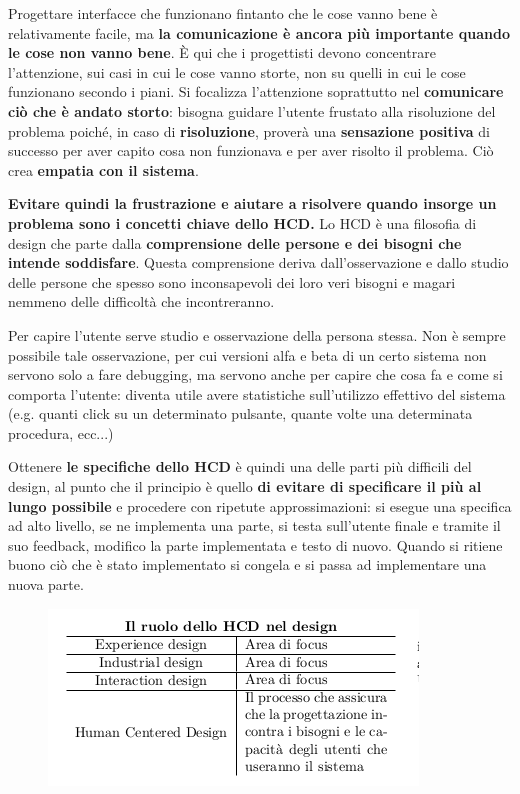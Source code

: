 \documentclass[a4paper,11pt,oneside]{book}
\begin{document}
Progettare interfacce che funzionano fintanto che le cose vanno bene è relativamente facile, ma \textbf{la comunicazione è ancora più importante quando le cose non vanno bene}. È qui che i progettisti devono concentrare l'attenzione, sui casi in cui le cose vanno storte, non su quelli in cui le cose funzionano secondo i piani. Si focalizza l'attenzione soprattutto nel \textbf{comunicare ciò che è andato storto}: bisogna guidare l'utente frustato alla risoluzione del problema poiché, in caso di \textbf{risoluzione}, proverà una \textbf{sensazione positiva} di successo per aver capito cosa non funzionava e per aver risolto il problema. Ciò crea \textbf{empatia con il sistema}.

\textbf{Evitare quindi la frustrazione e aiutare a risolvere quando insorge un problema sono i concetti chiave dello HCD.}
Lo HCD è una filosofia di design che parte dalla \textbf{comprensione delle persone e dei bisogni che intende soddisfare}. Questa comprensione deriva dall'osservazione e dallo studio delle persone che spesso sono inconsapevoli dei loro veri bisogni e magari nemmeno delle difficoltà che incontreranno.

Per capire l'utente serve studio e osservazione della persona stessa. Non è sempre possibile tale osservazione, per cui versioni alfa e beta di un certo sistema non servono solo a fare debugging, ma servono anche per capire che cosa fa e come si comporta l'utente: diventa utile avere statistiche sull'utilizzo effettivo del sistema (e.g. quanti click su un determinato pulsante, quante volte una determinata procedura, ecc...)

\pagebreak

Ottenere \textbf{le specifiche dello HCD} è quindi una delle parti più difficili del design, al punto che il principio è quello \textbf{di evitare di specificare il più al lungo possibile} e procedere con ripetute approssimazioni: si esegue una specifica ad alto livello, se ne implementa una parte, si testa sull'utente finale e tramite il suo feedback, modifico la parte implementata e testo di nuovo. Quando si ritiene buono ciò che è stato implementato si congela e si passa ad implementare una nuova parte.

\begin{figure}[!h]
	\centering
	\includegraphics[scale=0.5]{immagini/HCD}
\end{figure}
\end{document}
